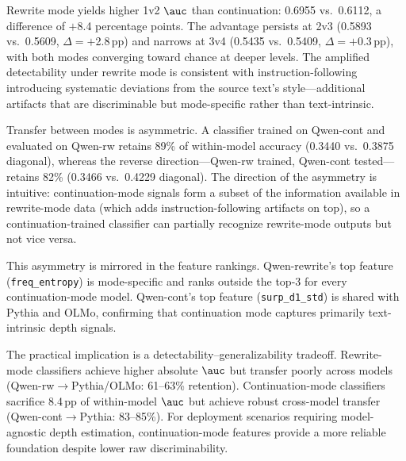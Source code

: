Rewrite mode yields higher 1v2 $\auc$ than continuation:
0.6955 vs.\ 0.6112, a difference of $+$8.4 percentage points.
The advantage persists at 2v3
(0.5893 vs.\ 0.5609, $\Delta = +$2.8\,pp)
and narrows at 3v4
(0.5435 vs.\ 0.5409, $\Delta = +$0.3\,pp),
with both modes converging toward chance at deeper levels.
The amplified detectability under rewrite mode is consistent
with instruction-following introducing systematic deviations
from the source text's style---additional artifacts that are
discriminable but mode-specific rather than text-intrinsic.

Transfer between modes is asymmetric.
A classifier trained on Qwen-cont and evaluated on Qwen-rw
retains 89\% of within-model accuracy
(0.3440 vs.\ 0.3875 diagonal),
whereas the reverse direction---Qwen-rw trained,
Qwen-cont tested---retains 82\%
(0.3466 vs.\ 0.4229 diagonal).
The direction of the asymmetry is intuitive:
continuation-mode signals form a subset of the information
available in rewrite-mode data
(which adds instruction-following artifacts on top),
so a continuation-trained classifier can partially recognize
rewrite-mode outputs but not vice versa.

This asymmetry is mirrored in the feature rankings.
Qwen-rewrite's top feature (\texttt{freq\_entropy}) is
mode-specific and ranks outside the top-3 for every
continuation-mode model.
Qwen-cont's top feature (\texttt{surp\_d1\_std}) is shared
with Pythia and OLMo, confirming that continuation mode
captures primarily text-intrinsic depth signals.

The practical implication is a detectability--generalizability
tradeoff.
Rewrite-mode classifiers achieve higher absolute $\auc$ but
transfer poorly across models
(Qwen-rw$\to$Pythia/OLMo: 61--63\% retention).
Continuation-mode classifiers sacrifice 8.4\,pp of within-model
$\auc$ but achieve robust cross-model transfer
(Qwen-cont$\to$Pythia: 83--85\%).
For deployment scenarios requiring model-agnostic depth
estimation, continuation-mode features provide a more reliable
foundation despite lower raw discriminability.
